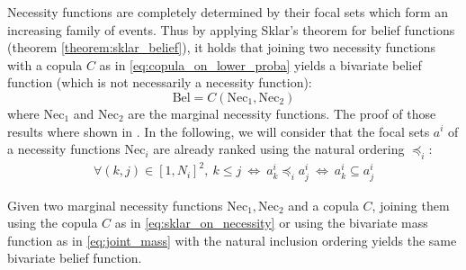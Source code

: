 Necessity functions are completely determined by their focal sets which form an increasing family of events. Thus by applying Sklar's theorem for belief functions (theorem \ref{theorem:sklar_belief}), it holds that joining two necessity functions with a copula $C$ as in \eqref{eq:copula_on_lower_proba} yields a bivariate belief function (which is not necessarily a necessity function):
\begin{equation}
    \mathrm{Bel} = C(\mathrm{Nec}_1, \mathrm{Nec}_2)\label{eq:sklar_on_necessity}
\end{equation}
where $\mathrm{Nec}_1$ and $\mathrm{Nec}_2$ are the marginal necessity functions. The proof of those results where shown in \cite{schmelzer_joint_2015,schmelzer_sklars_2015}. In the following, we will consider that the focal sets $a^i$ of a necessity functions $\mathrm{Nec}_i$ are already ranked using the natural ordering $\preceq_i$:
\begin{eqnarray}
    \forall (k,j)\in[1, N_i]^2,~k\leqslant j ~\Leftrightarrow ~ a^i_k \preceq_i a^i_j ~\Leftrightarrow ~ a^i_k\subseteq a^i_j
\end{eqnarray}

\begin{proposition}\label{prop:sklar_necessity}
    Given two marginal necessity functions $\mathrm{Nec}_1, \mathrm{Nec}_2$ and a copula $C$, joining them using the copula $C$ as in \eqref{eq:sklar_on_necessity} or using the bivariate mass function as in \eqref{eq:joint_mass} with the natural inclusion ordering yields the same bivariate belief function.
\end{proposition}

